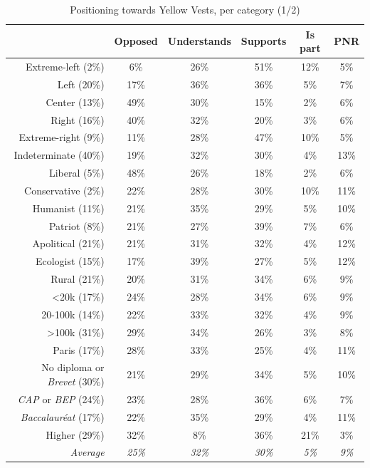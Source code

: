 \documentclass[aspectratio=169,9pt,dvipsnames]{beamer}
\begin{document}
    \begin{frame}\label{who_are_the_YV_1}

\begin{table}
\centering
\caption{Positioning towards Yellow Vests, per category (1/2)}
{\fontsize{6}{6}\selectfont
\begin{tabular}{rccccc}
  \hline \hline
 & Opposed & Understands & Supports & Is part & PNR \\ 
  \hline
  Extreme-left (2\%) & 6\% & 26\% & 51\% & 12\% & 5\% \\ 
  Left (20\%) & 17\% & 36\% & 36\% & 5\% & 7\% \\ 
  Center (13\%) & 49\% & 30\% & 15\% & 2\% & 6\% \\ 
  Right (16\%) & 40\% & 32\% & 20\% & 3\% & 6\% \\ 
  Extreme-right (9\%) & 11\% & 28\% & 47\% & 10\% & 5\% \\
  Indeterminate (40\%) & 19\% & 32\% & 30\% & 4\% & 13\% \\
  \hline
  Liberal (5\%) & 48\% & 26\% & 18\% & 2\% & 6\% \\
  Conservative (2\%) & 22\% & 28\% & 30\% & 10\% & 11\% \\
  Humanist (11\%) & 21\% & 35\% & 29\% & 5\% & 10\% \\
  Patriot (8\%) & 21\% & 27\% & 39\% & 7\% & 6\% \\
  Apolitical (21\%) & 21\% & 31\% & 32\% & 4\% & 12\% \\
  Ecologist (15\%) & 17\% & 39\% & 27\% & 5\% & 12\% \\
  \hline
  Rural (21\%) & 20\% & 31\% & 34\% & 6\% & 9\% \\ 
  <20k (17\%) & 24\% & 28\% & 34\% & 6\% & 9\% \\ 
  20-100k (14\%) & 22\% & 33\% & 32\% & 4\% & 9\% \\ 
  >100k (31\%) & 29\% & 34\% & 26\% & 3\% & 8\% \\ 
  Paris (17\%) & 28\% & 33\% & 25\% & 4\% & 11\% \\
  \hline
  No diploma or \textit{Brevet} (30\%) & 21\% & 29\% & 34\% & 5\% & 10\% \\ 
  \textit{CAP} or \textit{BEP} (24\%) & 23\% & 28\% & 36\% & 6\% & 7\% \\ 
  \textit{Baccalauréat} (17\%) & 22\% & 35\% & 29\% & 4\% & 11\% \\ 
  Higher (29\%) & 32\% & 8\% & 36\% & 21\% & 3\% \\
  \hline
  \textit{Average} & \textit{25\%} & \textit{32\%} & \textit{30\%} & \textit{5\%} & \textit{9\%} \\ 
   \hline \hline
\end{tabular}
}
\end{table}

\hyperlink{discussion}{}

    \end{frame}
\end{document}
